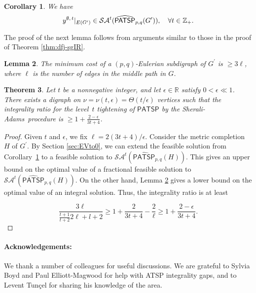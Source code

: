 \documentclass[11pt]{article}
\newtheorem{theorem}{Theorem}[section]
\newtheorem{lemma}[theorem]{Lemma}
\newtheorem{corollary}[theorem]{Corollary}
\newcommand{\sa}{\textsf{Sherali-Adams}}
\newcommand \reals {\mathbb{R}}
\def \integers {\mathbb{Z}}
\newcommand{\PATSP}{\textsf{PATSP}}
\newcommand{\PATSPpolytope}{\widehat{\textsf{PATSP}}}
\newcommand{\saop}{\mathcal{SA}}
\newcommand{\homog}[1]{{#1}}
\begin{document}
\begin{corollary}\label{thm:PATSP-feasol}
We have 
\[
\zvec{\emptyset}{t}|_{E(G^{\prime})}\in
	\saop^t(\homog{\PATSPpolytope_{p, q}(G^{\prime})}), \quad \forall t \in \integers_+.
\]
\end{corollary}

The proof of the next lemma follows from arguments similar to
those in the proof of Theorem \ref{thm:dfj-sgIR}.
\begin{lemma}\label{PATSP:is-lowerbound}
The minimum cost of a $(p, q)$-Eulerian subdigraph of $G^{\prime}$ is
$\geq 3\ell$, where $\ell$ is the number of edges in
the middle path in $G$.
\end{lemma}

\begin{theorem}
Let $t$ be a nonnegative integer, and let $\epsilon\in\reals$
satisfy $0<\epsilon\ll{1}$.
There exists a digraph on $\nu=\nu(t,\epsilon)=\Theta(t/\epsilon)$ vertices
such that the integrality ratio for
the level~$t$ tightening of $\PATSP$ by the \sa\ procedure is
$\ge 1 + \frac{2-\epsilon}{3t+4}$.
\end{theorem}
\begin{proof}
Given $t$ and $\epsilon$, we
fix $\ell= 2 (3t+4)/\epsilon$.
Consider the metric completion $H$ of $G^{\prime}$. By Section
\ref{sec:EVto0}, we can extend the feasible solution from 
Corollary~\ref{thm:PATSP-feasol} to a feasible solution to
$\saop^t(\homog{\PATSPpolytope_{p, q}(H)})$. This gives an upper bound
on the optimal value of a fractional feasible solution to
$\saop^t(\homog{\PATSPpolytope_{p,q}(H)})$. On the other hand,
Lemma \ref{PATSP:is-lowerbound} gives a lower bound on
the optimal value of an integral solution.
Thus, the integrality ratio is at least

\[\frac{3\ell}{\frac{t+1}{t+2}2\ell + l + 2} \ge
	1+\frac{2}{3t+4} - \frac{2}{\ell} \ge
	1+ \frac{2 - \epsilon}{3t+4}.
\]
\end{proof}



\paragraph {Acknowledgements:}
We thank a number of colleagues for useful discussions.
We are grateful to Sylvia Boyd and Paul Elliott-Magwood
for help with ATSP integrality gaps, and to
Levent Tun\c{c}el for sharing his knowledge of the area.







\end{document}
